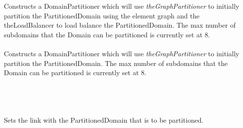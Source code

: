   \\
 \\
Constructs a DomainPartitioner which will use {\em
theGraphPartitioner} to initially partition the PartitionedDomain
using the element graph and the \p theLoadBalancer to load balance 
the PartitionedDomain. The max number of subdomains that the Domain can be 
partitioned is currently set at 8.\\

\\
Constructs a DomainPartitioner which will use {\em
theGraphPartitioner} to initially partition the PartitionedDomain. The
max number of subdomains that the Domain can be partitioned is
currently set at 8.\\ 

  \\
  \\


  \\
\\
Sets the link with the PartitionedDomain that is to be partitioned. \\

